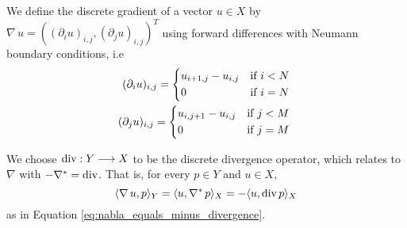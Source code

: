     \begin{definition} %
    \label{def:discrete_gradient_operator}

        We define the discrete gradient of a vector $u \in X$ by $\nabla\,u = ((\partial_{i}u)_{i, j}, (\partial_{j}u)_{i, j})^{T}$ using forward differences with Neumann boundary conditions, i.e
            \begin{eqnarray}
                (\partial_{i}u)_{i, j} =
                    \begin{dcases*}
                        u_{i+1, j} - u_{i, j} & \textnormal{if $i < N$}\\
                        0 & \textnormal{if $i = N$}
                    \end{dcases*}
                \label{eq:forward_partial_i} \\
                (\partial_{j}u)_{i, j} =
                    \begin{dcases*}
                        u_{i, j+1} - u_{i, j} & \textnormal{if $j < M$}\\
                        0 & \textnormal{if $j = M$}
                    \end{dcases*}
                \label{eq:forward_partial_j}
            \end{eqnarray}

    \end{definition}

    We choose $\textnormal{div}: Y \longrightarrow X$ to be the discrete divergence operator, which relates to $\nabla$ with $- \nabla^{\ast} = \textnormal{div}$. That is, for every $p \in Y$ and $u \in X$,
        $$
            \langle \nabla\, u, p \rangle_{Y} = \langle u, \nabla^{\ast}\, p \rangle_{X} = - \langle u, \textnormal{div}\,p \rangle_{X}
        $$
    as in Equation \ref{eq:nabla_equals_minus_divergence}.

